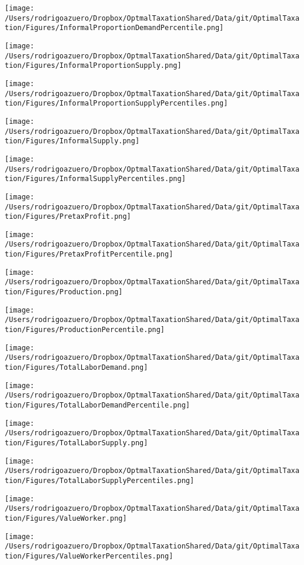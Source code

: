 \documentclass[12pt]{article}
\begin{document}
\texttt{[image: /Users/rodrigoazuero/Dropbox/OptmalTaxationShared/Data/git/OptimalTaxation/Figures/InformalProportionDemandPercentile.png]}

\texttt{[image: /Users/rodrigoazuero/Dropbox/OptmalTaxationShared/Data/git/OptimalTaxation/Figures/InformalProportionSupply.png]}

\texttt{[image: /Users/rodrigoazuero/Dropbox/OptmalTaxationShared/Data/git/OptimalTaxation/Figures/InformalProportionSupplyPercentiles.png]}

\texttt{[image: /Users/rodrigoazuero/Dropbox/OptmalTaxationShared/Data/git/OptimalTaxation/Figures/InformalSupply.png]}

\texttt{[image: /Users/rodrigoazuero/Dropbox/OptmalTaxationShared/Data/git/OptimalTaxation/Figures/InformalSupplyPercentiles.png]}

\texttt{[image: /Users/rodrigoazuero/Dropbox/OptmalTaxationShared/Data/git/OptimalTaxation/Figures/PretaxProfit.png]}

\texttt{[image: /Users/rodrigoazuero/Dropbox/OptmalTaxationShared/Data/git/OptimalTaxation/Figures/PretaxProfitPercentile.png]}

\texttt{[image: /Users/rodrigoazuero/Dropbox/OptmalTaxationShared/Data/git/OptimalTaxation/Figures/Production.png]}

\texttt{[image: /Users/rodrigoazuero/Dropbox/OptmalTaxationShared/Data/git/OptimalTaxation/Figures/ProductionPercentile.png]}

\texttt{[image: /Users/rodrigoazuero/Dropbox/OptmalTaxationShared/Data/git/OptimalTaxation/Figures/TotalLaborDemand.png]}

\texttt{[image: /Users/rodrigoazuero/Dropbox/OptmalTaxationShared/Data/git/OptimalTaxation/Figures/TotalLaborDemandPercentile.png]}

\texttt{[image: /Users/rodrigoazuero/Dropbox/OptmalTaxationShared/Data/git/OptimalTaxation/Figures/TotalLaborSupply.png]}

\texttt{[image: /Users/rodrigoazuero/Dropbox/OptmalTaxationShared/Data/git/OptimalTaxation/Figures/TotalLaborSupplyPercentiles.png]}

\texttt{[image: /Users/rodrigoazuero/Dropbox/OptmalTaxationShared/Data/git/OptimalTaxation/Figures/ValueWorker.png]}

\texttt{[image: /Users/rodrigoazuero/Dropbox/OptmalTaxationShared/Data/git/OptimalTaxation/Figures/ValueWorkerPercentiles.png]}
\end{document}
